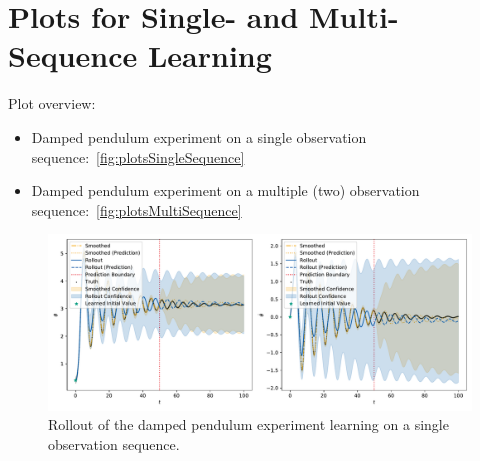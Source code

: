 \section{Plots for Single- and Multi-Sequence Learning}
	\label{app:plotsSingleMulti}

	Plot overview:
	\begin{itemize}
		\item Damped pendulum experiment on a single observation sequence:~\autoref{fig:plotsSingleSequence}
		\item Damped pendulum experiment on a multiple (two) observation sequence:~\autoref{fig:plotsMultiSequence}
	\end{itemize}

	\begin{figure}
		\centering
		\includegraphics[width=\linewidth]{figures/results/single-vs-multi-sequence/pendulum-damped-single/rollout-observations-N0.pdf}
		\caption{Rollout of the damped pendulum experiment learning on a single observation sequence.}
		\label{fig:plotsSingleSequence}
	\end{figure}
